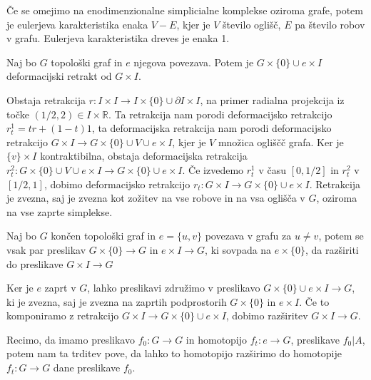 \documentclass[mat1]{fmfdelo}
\begin{document}
Če se omejimo na enodimenzionalne simplicialne komplekse oziroma grafe, 
potem je eulerjeva karakteristika enaka $V-E$, kjer je $V$ število 
oglišč, $E$ pa 
število robov v grafu. Eulerjeva karakteristika dreves je enaka 1.

\begin{trditev}
    Naj bo $G$ topološki graf in $e$ njegova povezava. Potem je
    $G\times \{0\}\cup e\times I$ deformacijski retrakt od $G\times I$.
\end{trditev}

\begin{dokaz}
    Obstaja retrakcija $r: I\times I \rightarrow I\times \{0\} \cup \partial I \times I$, na primer radialna projekcija iz točke $(1/2,2)\in I\times \mathbb{R}$. Ta retrakcija nam porodi deformacijsko retrakcijo $r^1_t=tr+(1-t)1$, ta deformacijska retrakcija nam porodi deformacijsko retrakcijo $G\times I \rightarrow G\times\{0\} \cup {V\cup e \times I}$, kjer je $V$ množica ogliščč grafa. Ker je $\{v\}\times I$ kontraktibilna, obstaja deformacijska retrakcija $r^2_t: G\times\{0\} \cup {V\cup e \times I}\rightarrow G\times\{0\} \cup { e \times I}$. Če izvedemo $r_t^1$ v času $[0,1/2]$ in $r^2_t$ v $[1/2,1]$, dobimo deformacijsko retrakcijo $r_t:G\times I \rightarrow G\times\{0\} \cup {e \times I}$. Retrakcija je zvezna, saj je zvezna kot zožitev na vse robove in na vsa oglišča v $G$, oziroma na vse zaprte simplekse.
\end{dokaz}

\begin{trditev}
    Naj bo $G$ končen topološki graf in  $e=\{u,v\}$ povezava v grafu za $u\neq v$, potem se vsak par preslikav $G\times \{0\}\rightarrow G$ in $e\times I \rightarrow G$, ki sovpada na $e\times \{0\}$, da razširiti do preslikave $G\times I \rightarrow G$
\end{trditev}

\begin{dokaz}
    Ker je $e$ zaprt v $G$, lahko preslikavi združimo v preslikavo $G\times \{0\}\cup e\times I\rightarrow G$, ki je zvezna, saj je zvezna na zaprtih podprostorih $G\times \{0\}$ in $e\times I$. Če to komponiramo z retrakcijo $G\times I \rightarrow G\times \{0\}\cup e\times I$, dobimo razširitev $G\times I \rightarrow G.$
\end{dokaz}

Recimo, da imamo preslikavo $f_0:G\rightarrow G$ in homotopijo $f_t:e\rightarrow G$, preslikave $f_0|A$, potem nam ta trditev pove, da lahko to homotopijo razširimo do homotopije $f_t:G\rightarrow G$ dane preslikave $f_0$.
\end{document}

